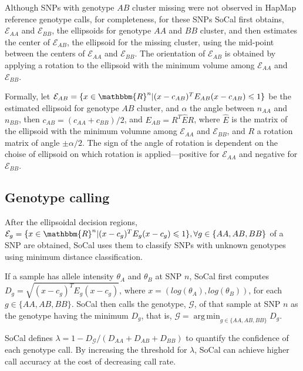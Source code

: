 \documentclass{scrartcl}
\begin{document}
Although SNPs with genotype $AB$ cluster missing were not observed in HapMap
reference genotype calls, for completeness, for these SNPs SoCal first
obtains, $\mathcal{E}_{AA}$ and $\mathcal{E}_{BB}$,
the ellipsoids for genotype $AA$ and $BB$ cluster, and then estimates the
center of $\mathcal{E}_{AB}$, the ellipsoid for the missing cluster, using
the mid-point between the centers of $\mathcal{E}_{AA}$ and $\mathcal{E}_{BB}$.
The orientation of $\mathcal{E}_{AB}$ is obtained by applying a rotation
to the ellipsoid with the minimum volume among $\mathcal{E}_{AA}$ and
$\mathcal{E}_{BB}$.

\par
Formally, let $\mathcal{E}_{AB}=
\{x \in \mathbbm{R}^{n}|(x-c_{AB})^TE_{AB}(x-c_{AB}) \leqslant 1\}$ be the
estimated ellipsoid for genotype $AB$ cluster, and $\alpha$ the angle between
$n_{AA}$ and $n_{BB}$, then
$c_{AB}=(c_{AA}+c_{BB})/2$, and
$E_{AB}=R^{T}\hat{E}R$, where $\hat{E}$ is the matrix of the ellipsoid
with the minimum volumne among $\mathcal{E}_{AA}$ and $\mathcal{E}_{BB}$, and
$R$ a rotation matrix of angle $\pm\alpha/2$.
The sign of the angle of rotation is dependent on the choise of ellipsoid on
which rotation is applied---positive for $\mathcal{E}_{AA}$ and negative
for $\mathcal{E}_{BB}$.

\subsection{Genotype calling}

\par
After the ellipsoidal decision regions,
$\mathcal{E}_{g}=
\{x \in \mathbbm{R}^{n} | (x-c_g)^TE_g(x-c_g) \leqslant 1\},
\forall g\in\{AA,AB,BB\}$ of a SNP are obtained, SoCal uses them to classify
SNPs with unknown genotypes using minimum distance classification.

\par
If a sample has allele intensity $\theta_A$ and $\theta_B$ at SNP $n$,
SoCal first computes
$D_g=\sqrt{(x-c_g)^TE_g(x-c_g)}$,
where $x=(log(\theta_A), log(\theta_B))$, for each $g\in\{AA,AB,BB\}$.
SoCal then calls the genotype, $\mathcal{G}$, of that sample at SNP $n$
as the genotype having the minimum $D_g$, that is,
$\mathcal{G}=\operatorname*{arg\,min}_{g\in \{AA,AB,BB\}}D_g$.

\par
SoCal defines $\lambda=1-D_{\mathcal{G}}/(D_{AA}+D_{AB}+D_{BB})$ to quantify
the confidence of each genotype call.
By increasing the threshold for $\lambda$, SoCal can achieve higher call
accuracy at the cost of decreasing call rate.
\end{document}
